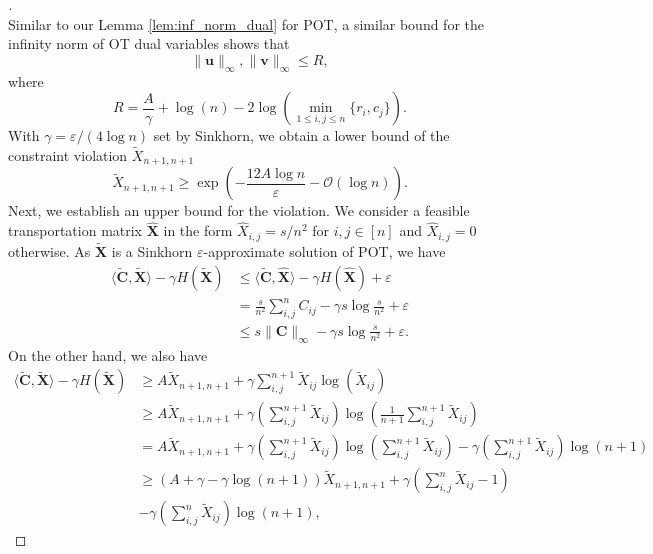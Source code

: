\begin{proof}[\unskip \nopunct]
\begin{equation*}
\end{equation*}
Similar to our Lemma \ref{lem:inf_norm_dual} for POT, a similar bound for the infinity norm of OT dual variables \citep[Lemma 3.2]{nhatho-mmpot} shows that $$\| \mathbf{u} \|_\infty, \| \mathbf{v} \|_\infty \leq R,$$ where $$R =  \dfrac{A}{\gamma} + \log(n) - 2 \log\left({\min_{1\leq i, j\leq n}\{r_i, c_j\}}\right).$$ With $\gamma = \varepsilon / (4 \log{n})$ set by Sinkhorn, we obtain a lower bound of  the constraint violation $\tilde{X}_{n+1,n+1}$
\begin{equation*}
   \tilde{X}_{n+1,n+1} \geq \exp\left(-\dfrac{12A \log{n}}{\varepsilon} - \mathcal{O}(\log{n})\right ). 
\end{equation*}
Next, we establish an upper bound for the violation. We consider a feasible transportation matrix $\mathbf{\hat{X}}$ in the form $\hat{X}_{i,j} = s / n^2$ for $i,j\in[n]$ and $\hat{X}_{i,j} = 0$ otherwise. As $\mathbf{\tilde{X}}$ is a Sinkhorn $\varepsilon$-approximate solution of POT, we have 
\begin{align*}
    \langle \mathbf{\tilde{C}}, \mathbf{\tilde{X}} \rangle - \gamma H(\mathbf{\tilde{X}}) &\leq \langle \mathbf{\tilde{C}}, \mathbf{\hat{X}} \rangle - \gamma H(\mathbf{\hat{X}}) + \varepsilon\\
    &= \frac{s}{n^2} \sum^{n}_{i,j} C_{ij} - \gamma s \log\frac{s}{n^2} + \varepsilon \\
    &\leq s \|\mathbf{C}\|_\infty - \gamma s \log\frac{s}{n^2} + \varepsilon.
\end{align*}
On the other hand, we also have 
\begin{align*}
    \langle \mathbf{\tilde{C}}, \mathbf{\tilde{X}} \rangle - \gamma H(\mathbf{\tilde{X}}) &\geq A \tilde{X}_{n+1,n+1} + \gamma \sum^{n+1}_{i,j} \tilde{X}_{ij} \log(\tilde{X}_{ij}) \\
    &\geq A \tilde{X}_{n+1,n+1} + \gamma \left(\sum^{n+1}_{i,j} \tilde{X}_{ij}\right) \log \left( \frac{1}{n+1} \sum^{n+1}_{i,j} \tilde{X}_{ij} \right)\\
    &= A \tilde{X}_{n+1,n+1} + \gamma \left(\sum^{n+1}_{i,j} \tilde{X}_{ij}\right) \log \left(\sum^{n+1}_{i,j} \tilde{X}_{ij} \right) - \gamma \left(\sum^{n+1}_{i,j} \tilde{X}_{ij}\right) \log \left( n+1\right)\\
    &\geq (A + \gamma - \gamma \log(n+1))\tilde{X}_{n+1,n+1} + \gamma \left( \sum^{n}_{i,j} \tilde{X}_{ij} - 1 \right) \\
    &- \gamma \left(\sum^{n}_{i,j} \tilde{X}_{ij}\right) \log \left( n+1\right),
\end{align*}

\end{proof}
